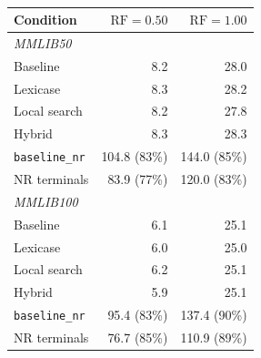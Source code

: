 \begin{table}[htbp]
  \centering
  \small
  \caption[108-class breakdown by resource factor]{}
  \label{tab:full108-rf}
  \begin{tabular}{lrr}
    \toprule
    \textbf{Condition} & $\mathrm{RF} = 0.50$ & $\mathrm{RF} = 1.00$ \\
    \midrule
    \multicolumn{3}{l}{\textit{MMLIB50}} \\
    Baseline & 8.2 & 28.0 \\
    Lexicase & 8.3 & 28.2 \\
    Local search & 8.2 & 27.8 \\
    Hybrid & 8.3 & 28.3 \\
    \texttt{baseline\_nr} & 104.8 (83\%) & 144.0 (85\%) \\
    NR terminals & 83.9 (77\%) & 120.0 (83\%) \\
    \midrule
    \multicolumn{3}{l}{\textit{MMLIB100}} \\
    Baseline & 6.1 & 25.1 \\
    Lexicase & 6.0 & 25.0 \\
    Local search & 6.2 & 25.1 \\
    Hybrid & 5.9 & 25.1 \\
    \texttt{baseline\_nr} & 95.4 (83\%) & 137.4 (90\%) \\
    NR terminals & 76.7 (85\%) & 110.9 (89\%) \\
    \bottomrule
  \end{tabular}
\end{table}

